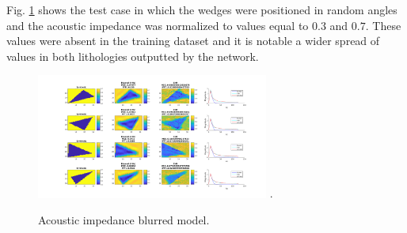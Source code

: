 \documentclass[conference,compsoc]{IEEEtran}
\begin{document}
Fig. \ref{fig_scenario3} shows the test case in which the wedges were positioned in random angles and the acoustic impedance
was normalized to values equal to $0.3$ and $0.7$. These values were absent in the training dataset and it
is notable a wider spread of values in both lithologies outputted by the network.
\begin{figure}[!t]
\centering
\includegraphics[width=3.0in]{Figs/Caso3}
\DeclareGraphicsExtensions.
\caption{Acoustic impedance blurred model.}
\label{fig_scenario3}
\end{figure}
%
%



%
%
\end{document}
